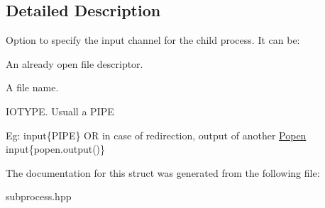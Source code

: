 \subsection{Detailed Description}
Option to specify the input channel for the child process. It can be\+:
\begin{DoxyEnumerate}
\item An already open file descriptor.
\item A file name.
\item I\+O\+T\+Y\+PE. Usuall a P\+I\+PE
\end{DoxyEnumerate}

Eg\+: input\{P\+I\+PE\} OR in case of redirection, output of another \hyperlink{classsubprocess_1_1Popen}{Popen} input\{popen.\+output()\} 

The documentation for this struct was generated from the following file\+:\begin{DoxyCompactItemize}
\item 
subprocess.\+hpp\end{DoxyCompactItemize}
